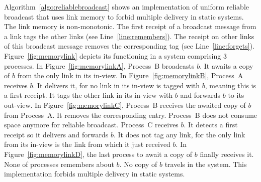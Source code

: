 Algorithm~\ref{algo:reliablebroadcast} shows an implementation of uniform
reliable broadcast that uses link memory to forbid multiple delivery in static
systems. The link memory is non-monotonic. The first receipt of a broadcast
message from a link tags the other links (see Line~\ref{line:remembers}). The
receipt on other links of this broadcast message removes the corresponding tag
(see Line~\ref{line:forgets}). Figure~\ref{fig:memorylink} depicts its
functioning in a system comprising 3 processes. In Figure~\ref{fig:memorylinkA},
Process~B broadcasts $b$. It awaits a copy of $b$ from the only link in its
in-view. In Figure~\ref{fig:memorylinkB}, Process~A receives $b$. It delivers
it, for no link in its in-view is tagged with $b$, meaning this is a first
receipt. It tags the other link in its in-view with $b$ and forwards $b$ to its
out-view. In Figure~\ref{fig:memorylinkC}, Process~B receives the awaited copy
of $b$ from Process~A. It removes the corresponding entry. Process~B does not
consume space anymore for reliable broadcast. Process~C receives $b$. It detects
a first receipt so it delivers and forwards $b$. It does not tag any link, for
the only link from its in-view is the link from which it just received $b$. In
Figure~\ref{fig:memorylinkD}, the last process to await a copy of $b$ finally
receives it. None of processes remembers about $b$. No copy of $b$ travels in
the system. This implementation forbids multiple delivery in static systems.




